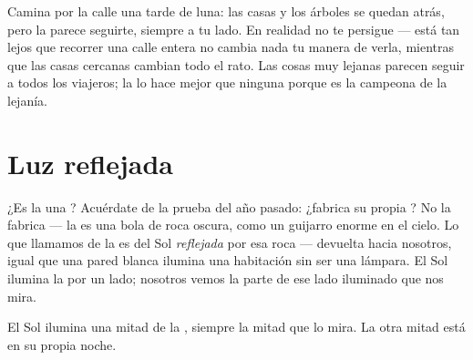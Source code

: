 \begin{example}\label{ex:g2:moon-in-the-sky:follows}
Camina por la calle una tarde de luna: las casas y los árboles se
quedan atrás, pero la  parece seguirte, siempre a tu lado. En
realidad no te persigue --- está tan lejos que recorrer una calle
entera no cambia nada tu manera de verla, mientras que las casas
cercanas cambian todo el rato. Las cosas muy lejanas parecen seguir a
todos los viajeros; la  lo hace mejor que ninguna porque es la
campeona de la lejanía.
\end{example}

\section{Luz reflejada}

\begin{example}\label{ex:g2:moon-in-the-sky:borrowed}
¿Es la  una ? Acuérdate de la prueba del año
pasado: ¿fabrica su propia ? No la fabrica --- la  es una
bola de roca oscura, como un guijarro enorme en el cielo. Lo que
llamamos  de la  es  del Sol \emph{reflejada} por esa roca
--- devuelta hacia nosotros, igual que una pared blanca ilumina una
habitación sin ser una lámpara. El Sol ilumina la  por un lado;
nosotros vemos la parte de ese lado iluminado que nos mira.
\end{example}

\begin{omfigure}

{\small El Sol ilumina una mitad de la , siempre la mitad que
lo mira. La otra mitad está en su propia noche.}
\end{omfigure}

